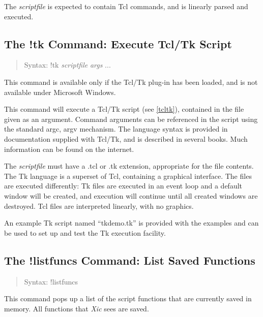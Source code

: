 The {\it scriptfile} is expected to contain Tcl commands, and is
linearly parsed and executed.

\subsection{The {\cb !tk} Command: Execute Tcl/Tk Script}
\begin{quote}
Syntax: {\vt !tk} {\it scriptfile} {\it args} ...
\end{quote}
This command is available only if the Tcl/Tk plug-in has been loaded,
and is not available under Microsoft Windows.

This command will execute a Tcl/Tk script (see \ref{tcltk}), contained
in the file given as an argument.  Command arguments can be referenced
in the script using the standard {\vt argc}, {\vt argv} mechanism. 
The language syntax is provided in documentation supplied with Tcl/Tk,
and is described in several books.  Much information can be found on
the internet.

The {\it scriptfile} must have a {\vt .tcl} or {\vt .tk} extension,
appropriate for the file contents.  The Tk language is a superset of
Tcl, containing a graphical interface.  The files are executed
differently:  Tk files are executed in an event loop and a default
window will be created, and execution will continue until all created
windows are destroyed.  Tcl files are interpreted linearly, with no
graphics.

An example Tk script named ``{\vt tkdemo.tk}'' is provided with the
examples and can be used to set up and test the Tk execution facility.

\subsection{The {\cb !listfuncs} Command: List Saved Functions}
\begin{quote}
Syntax: {\vt !listfuncs}
\end{quote}
This command pops up a list of the script functions that are currently
saved in memory.  All functions that {\it Xic} sees are saved.

